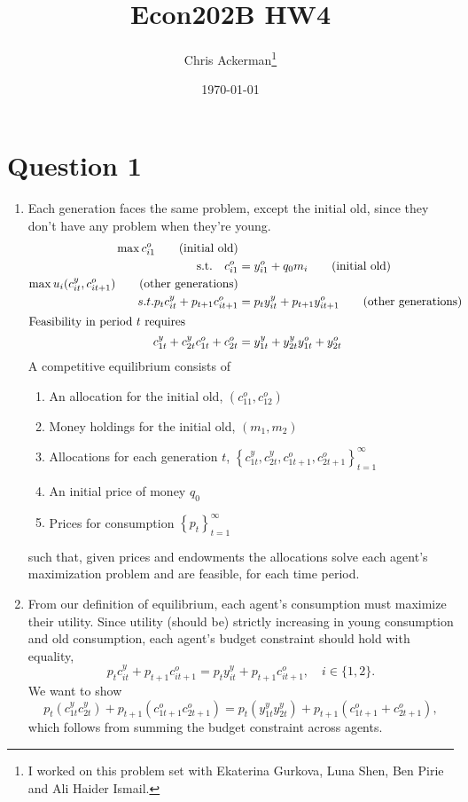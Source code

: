 \documentclass[11pt]{article}
\author{Chris Ackerman\thanks{I worked on this problem set with Ekaterina Gurkova, Luna Shen, Ben Pirie and Ali Haider Ismail.}}
\date{\today}
\title{Econ202B HW4}
\begin{document}
\maketitle
\tableofcontents

\newpage

\section{Question 1}
\label{sec:org921e40e}
\begin{enumerate}[label=\alph*)]
\item Each generation faces the same problem, except the initial old, since they don't have any problem when they're young.
\begin{align*}
\max c_{i1}^o \tag{initial old}\\
\text{s.t.\quad } c_{i1}^o &= y_{i1}^o + q_0 m_i \tag{initial old}\\
\max u_i(c_{it}^y, c_{it+1}^o) \tag{other generations}\\
s.t. p_t c_{it}^y + p_{t +  1}c_{it+1}^o &= p_t y_{it}^y + p_{t + 1} y_{it+1}^o \tag{other generations}\\
\intertext{Feasibility in period $t$ requires}
c_{1t}^y + c_{2t}^y    c_{1t}^o + c_{2t}^o &= y_{1t}^y + y_{2t}^y    y_{1t}^o + y_{2t}^o
\end{align*}
A competitive equilibrium consists of
\begin{enumerate}
\item An allocation for the initial old, $(c_{11}^o, c_{12}^o)$
\item Money holdings for the initial old, $(m_1, m_2)$
\item Allocations for each generation $t$, $\left\{c_{1t}^y, c_{2t}^y, c_{1t+1}^o, c_{2t+1}^o\right\}^\infty_{t = 1}$
\item An initial price of money $q_0$
\item Prices for consumption $\left\{p_t\right\}^\infty_{t = 1}$
\end{enumerate}
such that, given prices and endowments the allocations solve each agent's maximization problem and are feasible, for each time period.

\item
From our definition of equilibrium, each agent's consumption must maximize their utility. Since utility (should be) strictly increasing in young consumption and old consumption, each agent's budget constraint should hold with equality,
\[
p_t c_{it}^y + p_{t+1}c_{it+1}^o = p_t y_{it}^y + p_{t + 1}c_{it + 1}^o, \quad i \in \{1, 2\}.
\]
We want to show
\[
p_t (c_{1t}^y c_{2t}^y) + p_{t+1}(c_{1t+1}^o c_{2t+1}^o) = p_t (y_{1t}^y y_{2t}^y) + p_{t + 1}(c_{1t + 1}^o + c_{2t + 1}^o),
\]
which follows from summing the budget constraint across agents.


\end{enumerate}
\end{document}
